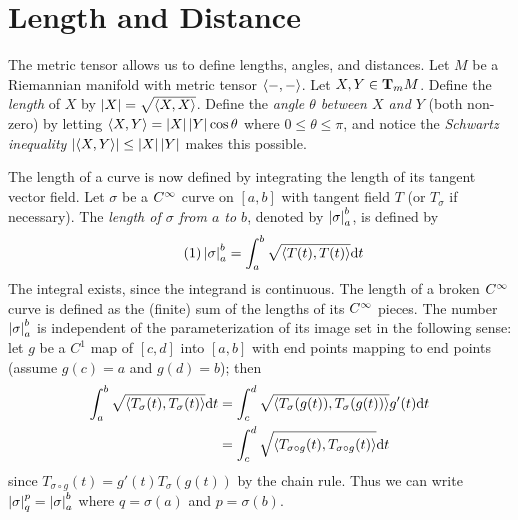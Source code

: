 \documentclass[../main]{subfiles}
\begin{document}
\section{Length and Distance}\label{ch06:s1}

The metric tensor allows us to define lengths, angles, and distances. Let $M$ be a Riemannian manifold with metric tensor $\ip{-}{-}$. Let $X,Y\in\tangentspace{M}{m}$. Define the \emph{length} of $X$ by $\norm{X} = \sqrt{\ip{X}{X}}$. Define the \emph{angle $\theta$ between $X$ and $Y$} (both non-zero) by letting $\ip{X}{Y} = \norm{X}\norm{Y}\cos\theta$
where $0 \le \theta \le \pi$, and notice the \emph{Schwartz inequality} $\norm{\ip{X}{Y}} \le \norm{X}\norm{Y}$
makes this possible.

The length of a curve is now defined by integrating the length of its tangent vector field. Let $\sigma$ be a $\CInfty$ curve on $[a,b]$ with tangent field $T$ (or $T_\sigma$ if necessary). The \emph{length of $\sigma$ from $a$ to $b$}, denoted by $\norm{\sigma}_a^b$, is defined by
\begin{equation}\tag{1}\label{eqn:ch6.1.1}
    \norm{\sigma}_a^b = \int_a^b \sqrt{\ip{T(t)}{T(t)}}\dd t
\end{equation}
The integral exists, since the integrand is continuous. The length of a broken $\CInfty$ curve is defined as the (finite) sum of the lengths of its $\CInfty$ pieces. The number $\norm\sigma_a^b$ is independent of the parameterization of its image set in the following sense: let $g$ be a $C^1$ map of $[c,d]$ into $[a,b]$ with end points mapping to end points (assume $g(c)=a$ and $g(d)=b$); then
\begin{align*}
    \int_a^b\sqrt{\ip{T_\sigma(t)}{T_\sigma(t)}}\dd t
    &= \int_c^d\sqrt{\ip{T_\sigma(g(t))}{T_\sigma(g(t))}}g'(t)\dd t \\
    &= \int_c^d\sqrt{\ip{T_{\sigma\circ g}(t)}{T_{\sigma\circ g}(t)}}\dd t
\end{align*}
since $T_{\sigma\circ g}(t)=g'(t)T_\sigma(g(t))$ by the chain rule. Thus we can write $\norm\sigma_q^p=\norm\sigma_a^b$ where $q=\sigma(a)$ and $p=\sigma(b)$.
\end{document}
